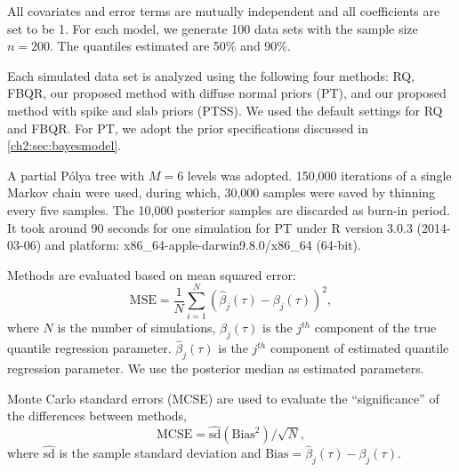 \documentclass[12pt]{article}
\newcommand{\polya}{P\'{o}lya}
\begin{document}
All covariates and error terms are mutually independent and all coefficients are set to be 1.
For each model, we generate 100 data sets with the sample size $n=200$.
The quantiles estimated are 50\% and 90\%.

Each simulated data set is analyzed using the following four methods:
RQ, FBQR, our proposed method with diffuse normal priors (PT), and our proposed method with spike and slab priors (PTSS).
We used the default settings for RQ and FBQR.
For PT, we adopt the prior specifications discussed in \ref{ch2:sec:bayesmodel}.

A partial \polya{} tree with $M=6$ levels was adopted.
150,000 iterations of a single Markov chain were used,
during which, 30,000 samples were saved by thinning every five samples.
The 10,000 posterior samples are discarded as burn-in period.
It took around 90 seconds for one simulation for PT under R version 3.0.3 (2014-03-06) and platform: x86\_64-apple-darwin9.8.0/x86\_64 (64-bit).

Methods are evaluated based on mean squared error:
\begin{displaymath}
  \mbox{MSE}  =  \frac{1}{N}\sum_{i = 1}^N (\hat{\beta}_j(\tau) -
  \beta_j(\tau))^2 ,
\end{displaymath}
where $N$ is the number of simulations, $\beta_j(\tau)$ is the $j^{th}$ component of the true quantile regression parameter.
$\hat{\beta}_j(\tau)$ is the $j^{th}$ component of estimated quantile regression parameter.
We use the posterior median as estimated parameters.

Monte Carlo standard errors (MCSE) are used to evaluate the ``significance'' of the differences between methods,
\begin{displaymath}
  \mbox{MCSE} = \widehat{\mbox{sd}}(\mbox{Bias}^2)/\sqrt{N},
\end{displaymath}
where $\widehat{\mbox{sd}}$ is the sample standard deviation and $\mbox{Bias} = \hat{\beta}_{j}(\tau) - \beta_{j}(\tau)$.
\end{document}
